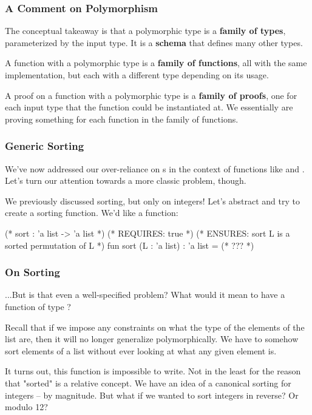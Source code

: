 \documentclass[aspectratio=169]{beamer}
\begin{document}
\begin{frame}[fragile]
  \frametitle{A Comment on Polymorphism}

  The conceptual takeaway is that a polymorphic type is a \textbf{family of types},
  parameterized by the input type. It is a \textbf{schema} that defines many other
  types.

  A function with a polymorphic type is a \textbf{family of functions}, all with
  the same implementation, but each with a different type depending on its usage.

  A proof on a function with a polymorphic type is a \textbf{family of proofs},
  one for each input type that the function could be instantiated at. We essentially
  are proving something for each function in the family of functions.
\end{frame}



\begin{frame}[fragile]
  \frametitle{Generic Sorting}

  We've now addressed our over-reliance on s in the context of functions like
   and . Let's turn our attention towards a more classic problem,
  though.
  
  We previously discussed sorting, but only on integers! Let's abstract and try to create a
   sorting function. We'd like a function: 

  \begin{codeblock}
    (* sort : 'a list -> 'a list *)
    (* REQUIRES: true *)
    (* ENSURES: sort L is a sorted permutation of L *)
    fun sort (L : 'a list) : 'a list = (* ??? *)
  \end{codeblock}
\end{frame}

\begin{frame}[fragile]
  \frametitle{On Sorting}

  ...But is that even a well-specified problem? What would it mean to have a function of
  type ?

  Recall that if we impose any constraints on what the type of the elements of the list are,
  then it will no longer generalize polymorphically. We have to somehow sort elements of a
  list without ever looking at what any given element is. 

  It turns out, this function is impossible to write. Not in the least for the reason that
  "sorted" is a relative concept. We have an idea of a canonical sorting for integers --
  by magnitude. But what if we wanted to sort integers in reverse? Or modulo 12?
\end{frame}
\end{document}
